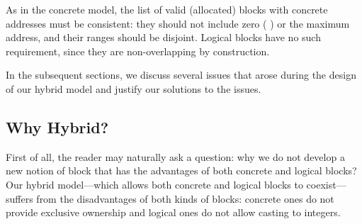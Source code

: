 As in the concrete model, the list of valid (\ie allocated) blocks with concrete addresses must be
consistent: they should not include zero (\ie{} ) or the maximum address, and their
ranges should be disjoint. Logical blocks have no such requirement, since they are non-overlapping
by construction.

In the subsequent sections, we discuss several issues that arose during the design of our hybrid
model and justify our solutions to the issues.

\subsection{Why Hybrid?}
\label{sec:intptrcast:formal-semantics:hybrid}


First of all, the reader may naturally ask a question: why we do not develop a new notion of block
that has the advantages of both concrete and logical blocks?  Our hybrid model---which allows both
concrete and logical blocks to coexist---suffers from the disadvantages of both kinds of blocks:
concrete ones do not provide exclusive ownership and logical ones do not allow casting to integers.


